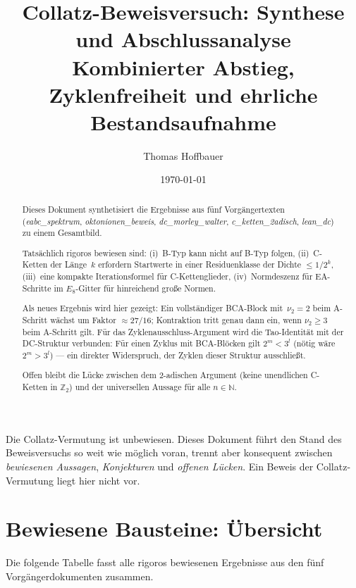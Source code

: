 \documentclass[12pt,a4paper]{article}
\title{%
  Collatz-Beweisversuch: Synthese und Abschlussanalyse\\[0.4em]
  \large Kombinierter Abstieg, Zyklenfreiheit und ehrliche Bestandsaufnahme%
}
\author{Thomas Hoffbauer}
\date{\today}
\newcommand{\vii}{\nu_2}
\newcommand{\N}{\mathbb{N}}
\newcommand{\Ztwo}{\mathbb{Z}_2}
\begin{document}
\maketitle

\begin{abstract}
Dieses Dokument synthetisiert die Ergebnisse aus fünf Vorgängertexten
(\textit{eabc\_spektrum}, \textit{oktonionen\_beweis},
\textit{dc\_morley\_walter}, \textit{c\_ketten\_2adisch},
\textit{lean\_dc}) zu einem Gesamtbild.

Tatsächlich rigoros bewiesen sind: (i)~B-Typ kann nicht auf B-Typ folgen,
(ii)~C-Ketten der Länge~$k$ erfordern Startwerte in einer Residuenklasse
der Dichte $\leq 1/2^k$, (iii)~eine kompakte Iterationsformel für
C-Kettenglieder, (iv)~Normdeszenz für EA-Schritte im $E_8$-Gitter für
hinreichend große Normen.

Als neues Ergebnis wird hier gezeigt: Ein vollständiger B\textbullet C\textbullet A-Block
mit~$\vii = 2$ beim A-Schritt wächst um Faktor $\approx 27/16$; Kontraktion
tritt genau dann ein, wenn $\vii \geq 3$ beim A-Schritt gilt.
Für das Zyklenausschluss-Argument wird die Tao-Identität mit der DC-Struktur
verbunden: Für einen Zyklus mit B\textbullet C\textbullet A-Blöcken gilt
$2^m < 3^l$ (nötig wäre $2^m > 3^l$) --- ein direkter Widerspruch,
der Zyklen dieser Struktur ausschließt.

Offen bleibt die Lücke zwischen dem 2-adischen Argument (keine unendlichen
C-Ketten in $\Ztwo$) und der universellen Aussage für alle $n \in \N$.
\end{abstract}

\tableofcontents

\bigskip
\begin{tcolorbox}[warnung, title={Zur Einordnung dieses Dokuments}]
Die Collatz-Vermutung ist unbewiesen. Dieses Dokument führt den Stand
des Beweisversuchs so weit wie möglich voran, trennt aber konsequent
zwischen \emph{bewiesenen Aussagen}, \emph{Konjekturen} und
\emph{offenen Lücken}. Ein Beweis der Collatz-Vermutung liegt hier nicht vor.
\end{tcolorbox}

\section{Bewiesene Bausteine: Übersicht}
\label{sec:bausteine}

Die folgende Tabelle fasst alle rigoros bewiesenen Ergebnisse aus
den fünf Vorgängerdokumenten zusammen.
\end{document}
